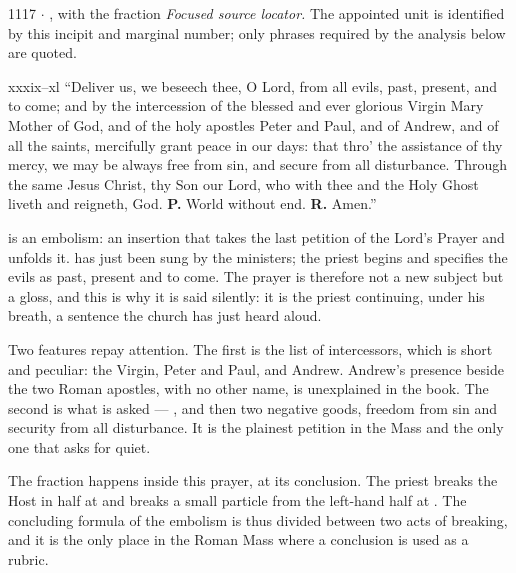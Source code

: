 \begin{appointed}{1117 $\cdot$ , with the fraction}
\textit{Focused source locator.} The appointed unit is identified by this incipit and marginal number; only phrases required by the analysis below are quoted.
\end{appointed}

\begin{englishwitness}{xxxix--xl}
``Deliver us, we beseech thee, O Lord, from all evils, past, present, and to
come; and by the intercession of the blessed and ever glorious Virgin Mary
Mother of God, and of the holy apostles Peter and Paul, and of Andrew, and of
all the saints, mercifully grant peace in our days: that thro' the assistance
of thy mercy, we may be always free from sin, and secure from all disturbance.
Through the same Jesus Christ, thy Son our Lord, who with thee and the Holy
Ghost liveth and reigneth, God. \textbf{P.} World without end. \textbf{R.}
Amen.''
\end{englishwitness}

 is an embolism: an insertion that takes the last petition
of the Lord's Prayer and unfolds it.  has just
been sung by the ministers; the priest begins  and specifies the evils as past, present and to come.
The prayer is therefore not a new subject but a gloss, and this is why it is
said silently: it is the priest continuing, under his breath, a sentence the
church has just heard aloud.

Two features repay attention. The first is the list of intercessors, which is
short and peculiar: the Virgin, Peter and Paul, and Andrew. Andrew's presence
beside the two Roman apostles, with no other name, is unexplained in the book.
The second is what is asked --- ,
and then two negative goods, freedom from sin and security from all
disturbance. It is the plainest petition in the Mass and the only one that asks
for quiet.

The fraction happens inside this prayer, at its conclusion. The priest breaks
the Host in half at  and breaks a small particle from the left-hand half at . The concluding formula of the embolism is thus divided
between two acts of breaking, and it is the only place in the Roman Mass where
a conclusion is used as a rubric.

